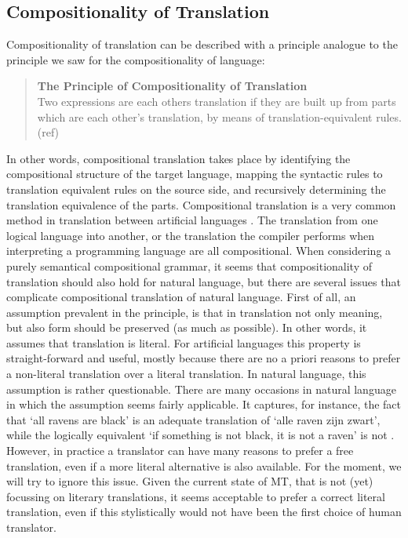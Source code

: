 \documentclass{report}
\theoremstyle{break}
\begin{document}
\subsection{Compositionality of Translation}

Compositionality of translation can be described with a principle analogue to the principle we saw for the compositionality of language:

\begin{quote}
\textbf{The Principle of Compositionality of Translation}\\
Two expressions are each others translation if they are built up from parts which are each other's translation, by means of translation-equivalent rules. (ref) \end{quote}

In other words, compositional translation takes place by identifying the compositional structure of the target language, mapping the syntactic rules to translation equivalent rules on the source side, and recursively determining the translation equivalence of the parts. Compositional translation is a very common method in translation between artificial languages \citep{janssen1996compositionality,janssen1998algebraic}. The translation from one logical language into another, or the translation the compiler performs when interpreting a programming language are all compositional. When considering a purely semantical compositional grammar, it seems that compositionality of translation should also hold for natural language, but there are several issues that complicate compositional translation of natural language.
First of all, an assumption prevalent in the principle, is that in translation not only meaning, but also form should be preserved (as much as possible). In other words, it assumes that translation is literal. For artificial languages this property is straight-forward and useful, mostly because there are no a priori reasons to prefer a non-literal translation over a literal translation. In natural language, this assumption is rather questionable. There are many occasions in natural language in which the assumption seems fairly applicable. It captures, for instance, the fact that `all ravens are black' is an adequate translation of `alle raven zijn zwart', while the logically equivalent `if something is not black, it is not a raven' is not \citep{landsbergen1989power}. However, in practice a translator can have many reasons to prefer a free translation, even if a more literal alternative is also available. For the moment, we will try to ignore this issue. Given the current state of MT, that is not (yet) focussing on literary translations, it seems acceptable to prefer a correct literal translation, even if this stylistically would not have been the first choice of human translator.
\end{document}
